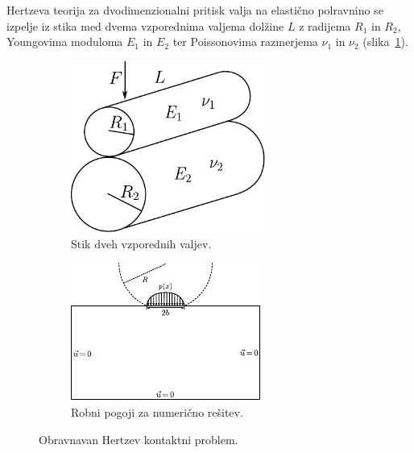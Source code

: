 \documentclass[12pt,a4paper,twoside]{article}
\theoremstyle{definition} %
\theoremstyle{plain} %
\numberwithin{equation}{section}
\begin{document}
Hertzeva teorija za dvodimenzionalni pritisk valja na elastično polravnino se izpelje iz stika med
dvema vzporednima valjema dolžine $L$ z radijema $R_1$ in $R_2$, Youngovima moduloma $E_1$ in $E_2$
ter Poissonovima razmerjema $\nu_1$ in $\nu_2$ (slika~\ref{fig:hetzian-two-cylinders}).

\begin{figure}[!h]
  \centering
  \begin{subfigure}[t]{0.40\textwidth}
    \includegraphics[width=0.7\textwidth]{images/hertzian_two_cylinders.pdf}
    \caption{Stik dveh vzporednih valjev.}
    \label{fig:hetzian-two-cylinders}
  \end{subfigure}
  \begin{subfigure}[t]{0.50\textwidth}
    \includegraphics[width=\textwidth]{images/hertzian_analytical_setup.pdf}
    \caption{Robni pogoji za numerično rešitev.}
    \label{fig:hertz-analytical-setup}
  \end{subfigure}
  \caption{Obravnavan Hertzev kontaktni problem.}
  \label{fig:hertz-skica}
\end{figure}
\end{document}
